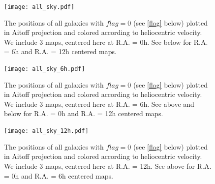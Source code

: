 \documentclass[twocolumn,tighten]{aastex62}
\begin{document}
\begin{figure}[p]
        \centering
        \vspace{0pt}
        \texttt{[image: all\_sky.pdf]} \label{a}
        \caption{\small{The positions of all galaxies with $flag=0$ (see \ref{flag} below) plotted in Aitoff projection and colored according to heliocentric velocity. We include 3 maps, centered here at R.A. = 0h. See below for R.A. = 6h and R.A. = 12h centered maps.}}
        \label{allskyvhel}
\end{figure}
\begin{figure}[p]
        \centering
        \vspace{0pt}      
        \texttt{[image: all\_sky\_6h.pdf]} \label{b}
        \caption{\small{The positions of all galaxies with $flag=0$ (see \ref{flag} below) plotted in Aitoff projection and colored according to heliocentric velocity. We include 3 maps, centered here at R.A. = 6h. See above and below for R.A. = 0h and R.A. = 12h centered maps.}}
        \label{allskyvhel}
\end{figure}
\begin{figure}[p]
        \centering
        \vspace{0pt}
        \texttt{[image: all\_sky\_12h.pdf]} \label{c}
        \caption{\small{The positions of all galaxies with $flag=0$ (see \ref{flag} below) plotted in Aitoff projection and colored according to heliocentric velocity. We include 3 maps, centered here at R.A. = 12h. See above for R.A. = 0h and R.A. = 6h centered maps.}}
        \label{allskyvhel}
\end{figure}
\end{document}
